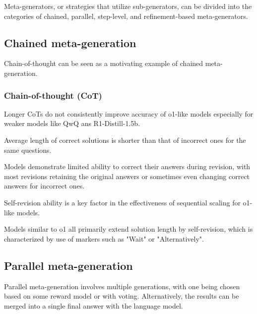 Meta-generators, or strategies that utilize sub-generators, can be divided into the categories of chained, parallel, step-level, and refinement-based meta-generators. \cite{welleck2024decodingmetagenerationinferencetimealgorithms}



\subsection{Chained meta-generation}
Chain-of-thought can be seen as a motivating example of chained meta-generation. \cite{welleck2024decodingmetagenerationinferencetimealgorithms}

\subsubsection{Chain-of-thought (CoT)}

Longer CoTs do not consistently improve accuracy of o1-like models especially for weaker models like QwQ ans R1-Distill-1.5b. \cite{zeng2025revisitingtesttimescalingo1like}

Average length of correct solutions is shorter than that of incorrect ones for the same questions. \cite{zeng2025revisitingtesttimescalingo1like}

Models demonstrate limited ability to correct their answers during revision, with most revisions retaining the original answers or sometimes even changing correct answers for incorrect ones. \cite{zeng2025revisitingtesttimescalingo1like}

Self-revision ability is a key factor in the effectiveness of sequential scaling for o1-like models. \cite{zeng2025revisitingtesttimescalingo1like}

Models similar to o1 all primarily extend solution length by self-revision, which is characterized by use of markers such as "Wait" or "Alternatively". \cite{zeng2025revisitingtesttimescalingo1like}




\subsection{Parallel meta-generation}

Parallel meta-generation involves multiple generations, with one being chosen based on some reward model or with voting. Alternatively, the results can be merged into a single final answer with the language model. \cite{welleck2024decodingmetagenerationinferencetimealgorithms}


